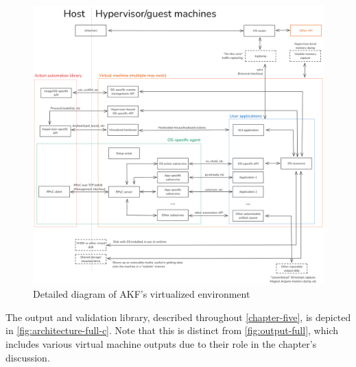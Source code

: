 \documentclass[letterpaper,12pt]{report}
\begin{document}
\begin{figure}[htbp]
\centering
\includegraphics[width=1\linewidth]{architecture-full-d.png}
\caption{Detailed diagram of AKF's virtualized
environment}\label{fig:architecture-full-d}
\end{figure}

The output and validation library, described throughout \autoref{chapter-five}, is depicted in
\autoref{fig:architecture-full-c}. Note that this is distinct from
\autoref{fig:output-full}, which includes various virtual machine
outputs due to their role in the chapter's discussion.
\end{document}
